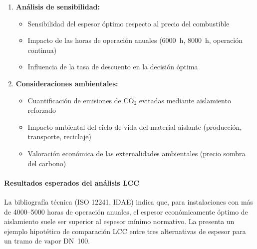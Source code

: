 \begin{enumerate}[label=\arabic*., leftmargin=2em]
	\item \textbf{Análisis de sensibilidad:}
	      \begin{itemize}[noitemsep]
		      \item Sensibilidad del espesor óptimo respecto al precio del combustible
		      \item Impacto de las horas de operación anuales (6000~h, 8000~h, operación continua)
		      \item Influencia de la tasa de descuento en la decisión óptima
	      \end{itemize}

	\item \textbf{Consideraciones ambientales:}
	      \begin{itemize}[noitemsep]
		      \item Cuantificación de emisiones de CO$_2$ evitadas mediante aislamiento reforzado
		      \item Impacto ambiental del ciclo de vida del material aislante (producción, transporte, reciclaje)
		      \item Valoración económica de las externalidades ambientales (precio sombra del carbono)
	      \end{itemize}
\end{enumerate}

\paragraph{Resultados esperados del análisis LCC}

La bibliografía técnica (ISO 12241, IDAE) indica que, para instalaciones con más de 4000--5000 horas de operación anuales, el espesor económicamente óptimo de aislamiento suele ser superior al espesor mínimo normativo. La  presenta un ejemplo hipotético de comparación LCC entre tres alternativas de espesor para un tramo de vapor DN~100.

